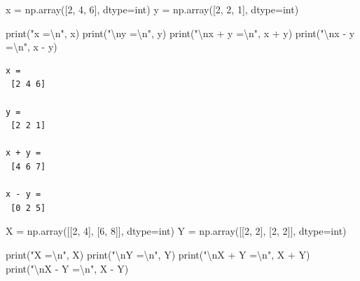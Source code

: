\documentclass[
  brazilian,
  letterpaper,
  DIV=11,
  numbers=noendperiod]{scrreprt}
\newenvironment{Shaded}{\begin{snugshade}}{\end{snugshade}}
\newcommand{\BuiltInTok}[1]{\textcolor[rgb]{0.00,0.23,0.31}{#1}}
\newcommand{\CharTok}[1]{\textcolor[rgb]{0.13,0.47,0.30}{#1}}
\newcommand{\DecValTok}[1]{\textcolor[rgb]{0.68,0.00,0.00}{#1}}
\newcommand{\NormalTok}[1]{\textcolor[rgb]{0.00,0.23,0.31}{#1}}
\newcommand{\OperatorTok}[1]{\textcolor[rgb]{0.37,0.37,0.37}{#1}}
\newcommand{\StringTok}[1]{\textcolor[rgb]{0.13,0.47,0.30}{#1}}
\begin{document}
\begin{Shaded}
\begin{Highlighting}[]
\NormalTok{x }\OperatorTok{=}\NormalTok{ np.array([}\DecValTok{2}\NormalTok{, }\DecValTok{4}\NormalTok{, }\DecValTok{6}\NormalTok{], dtype}\OperatorTok{=}\BuiltInTok{int}\NormalTok{)}
\NormalTok{y }\OperatorTok{=}\NormalTok{ np.array([}\DecValTok{2}\NormalTok{, }\DecValTok{2}\NormalTok{, }\DecValTok{1}\NormalTok{], dtype}\OperatorTok{=}\BuiltInTok{int}\NormalTok{)}

\BuiltInTok{print}\NormalTok{(}\StringTok{"x =}\CharTok{\textbackslash{}n}\StringTok{"}\NormalTok{, x)}
\BuiltInTok{print}\NormalTok{(}\StringTok{"}\CharTok{\textbackslash{}n}\StringTok{y =}\CharTok{\textbackslash{}n}\StringTok{"}\NormalTok{, y)}
\BuiltInTok{print}\NormalTok{(}\StringTok{"}\CharTok{\textbackslash{}n}\StringTok{x + y =}\CharTok{\textbackslash{}n}\StringTok{"}\NormalTok{, x }\OperatorTok{+}\NormalTok{ y)}
\BuiltInTok{print}\NormalTok{(}\StringTok{"}\CharTok{\textbackslash{}n}\StringTok{x {-} y =}\CharTok{\textbackslash{}n}\StringTok{"}\NormalTok{, x }\OperatorTok{{-}}\NormalTok{ y)}
\end{Highlighting}
\end{Shaded}

\begin{verbatim}
x =
 [2 4 6]

y =
 [2 2 1]

x + y =
 [4 6 7]

x - y =
 [0 2 5]
\end{verbatim}

\begin{Shaded}
\begin{Highlighting}[]
\NormalTok{X }\OperatorTok{=}\NormalTok{ np.array([[}\DecValTok{2}\NormalTok{, }\DecValTok{4}\NormalTok{], [}\DecValTok{6}\NormalTok{, }\DecValTok{8}\NormalTok{]], dtype}\OperatorTok{=}\BuiltInTok{int}\NormalTok{)}
\NormalTok{Y }\OperatorTok{=}\NormalTok{ np.array([[}\DecValTok{2}\NormalTok{, }\DecValTok{2}\NormalTok{], [}\DecValTok{2}\NormalTok{, }\DecValTok{2}\NormalTok{]], dtype}\OperatorTok{=}\BuiltInTok{int}\NormalTok{)}

\BuiltInTok{print}\NormalTok{(}\StringTok{"X =}\CharTok{\textbackslash{}n}\StringTok{"}\NormalTok{, X)}
\BuiltInTok{print}\NormalTok{(}\StringTok{"}\CharTok{\textbackslash{}n}\StringTok{Y =}\CharTok{\textbackslash{}n}\StringTok{"}\NormalTok{, Y)}
\BuiltInTok{print}\NormalTok{(}\StringTok{"}\CharTok{\textbackslash{}n}\StringTok{X + Y =}\CharTok{\textbackslash{}n}\StringTok{"}\NormalTok{, X }\OperatorTok{+}\NormalTok{ Y)}
\BuiltInTok{print}\NormalTok{(}\StringTok{"}\CharTok{\textbackslash{}n}\StringTok{X {-} Y =}\CharTok{\textbackslash{}n}\StringTok{"}\NormalTok{, X }\OperatorTok{{-}}\NormalTok{ Y)}
\end{Highlighting}
\end{Shaded}
\end{document}
